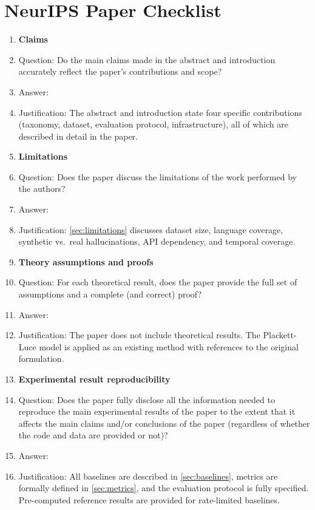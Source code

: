 \section*{NeurIPS Paper Checklist}

\begin{enumerate}

\item {\bf Claims}
    \item[] Question: Do the main claims made in the abstract and introduction accurately reflect the paper's contributions and scope?
    \item[] Answer: \answerYes{}
    \item[] Justification: The abstract and introduction state four specific contributions (taxonomy, dataset, evaluation protocol, infrastructure), all of which are described in detail in the paper.

\item {\bf Limitations}
    \item[] Question: Does the paper discuss the limitations of the work performed by the authors?
    \item[] Answer: \answerYes{}
    \item[] Justification: \cref{sec:limitations} discusses dataset size, language coverage, synthetic vs.\ real hallucinations, API dependency, and temporal coverage.

\item {\bf Theory assumptions and proofs}
    \item[] Question: For each theoretical result, does the paper provide the full set of assumptions and a complete (and correct) proof?
    \item[] Answer: \answerNA{}
    \item[] Justification: The paper does not include theoretical results. The Plackett-Luce model is applied as an existing method with references to the original formulation.

\item {\bf Experimental result reproducibility}
    \item[] Question: Does the paper fully disclose all the information needed to reproduce the main experimental results of the paper to the extent that it affects the main claims and/or conclusions of the paper (regardless of whether the code and data are provided or not)?
    \item[] Answer: \answerYes{}
    \item[] Justification: All baselines are described in \cref{sec:baselines}, metrics are formally defined in \cref{sec:metrics}, and the evaluation protocol is fully specified. Pre-computed reference results are provided for rate-limited baselines.


\end{enumerate}
